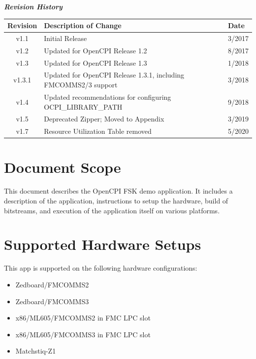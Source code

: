 	\begin{center}
	\textit{\textbf{Revision History}}
		\begin{table}[H]
		\label{table:revisions} %
			\begin{tabularx}{\textwidth}{|c|X|l|}
			\hline
			\rowcolor{blue}
			\textbf{Revision} & \textbf{Description of Change} & \textbf{Date} \\
		    \hline
		    v1.1 & Initial Release & 3/2017 \\
		    \hline
		    v1.2 & Updated for OpenCPI Release 1.2 & 8/2017 \\
			\hline
			v1.3 & Updated for OpenCPI Release 1.3 & 1/2018 \\
			\hline
			v1.3.1 & Updated for OpenCPI Release 1.3.1, including FMCOMMS2/3 support & 3/2018 \\
			\hline
			v1.4 & Updated recommendations for configuring OCPI\_LIBRARY\_PATH & 9/2018 \\
			\hline
			v1.5 & Deprecated Zipper; Moved to Appendix & 3/2019 \\
			\hline
			v1.7 & Resource Utilization Table removed & 5/2020 \\
			\hline
			\end{tabularx}
		\end{table}
	\end{center}

\newpage
\tableofcontents
\pagebreak
\section{Document Scope}
This document describes the OpenCPI FSK demo application. It includes a description of the application, instructions to setup the hardware, build of bitstreams, and execution of the application itself on various platforms.

\section{Supported Hardware Setups}
This app is supported on the following hardware configurations:
\begin{itemize}
  \item Zedboard/FMCOMMS2
  \item Zedboard/FMCOMMS3
  \item x86/ML605/FMCOMMS2 in FMC LPC slot
  \item x86/ML605/FMCOMMS3 in FMC LPC slot
  \item Matchstiq-Z1
\end{itemize}

